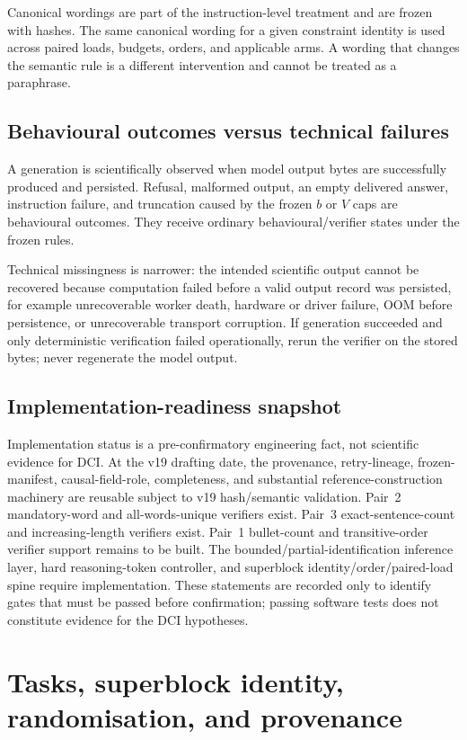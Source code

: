 \documentclass[11pt,a4paper]{article}
\begin{document}
Canonical wordings are part of the instruction-level treatment and are frozen with hashes. The same canonical wording for a given constraint identity is used across paired loads, budgets, orders, and applicable arms. A wording that changes the semantic rule is a different intervention and cannot be treated as a paraphrase.



\subsection{Behavioural outcomes versus technical failures}
A generation is scientifically observed when model output bytes are successfully produced and persisted. Refusal, malformed output, an empty delivered answer, instruction failure, and truncation caused by the frozen $b$ or $V$ caps are behavioural outcomes. They receive ordinary behavioural/verifier states under the frozen rules.

Technical missingness is narrower: the intended scientific output cannot be recovered because computation failed before a valid output record was persisted, for example unrecoverable worker death, hardware or driver failure, OOM before persistence, or unrecoverable transport corruption. If generation succeeded and only deterministic verification failed operationally, rerun the verifier on the stored bytes; never regenerate the model output.

\subsection{Implementation-readiness snapshot}
Implementation status is a pre-confirmatory engineering fact, not scientific evidence for DCI. At the v19 drafting date, the provenance, retry-lineage, frozen-manifest, causal-field-role, completeness, and substantial reference-construction machinery are reusable subject to v19 hash/semantic validation. Pair~2 mandatory-word and all-words-unique verifiers exist. Pair~3 exact-sentence-count and increasing-length verifiers exist. Pair~1 bullet-count and transitive-order verifier support remains to be built. The bounded/partial-identification inference layer, hard reasoning-token controller, and superblock identity/order/paired-load spine require implementation. These statements are recorded only to identify gates that must be passed before confirmation; passing software tests does not constitute evidence for the DCI hypotheses.

\section{Tasks, superblock identity, randomisation, and provenance}
\end{document}
